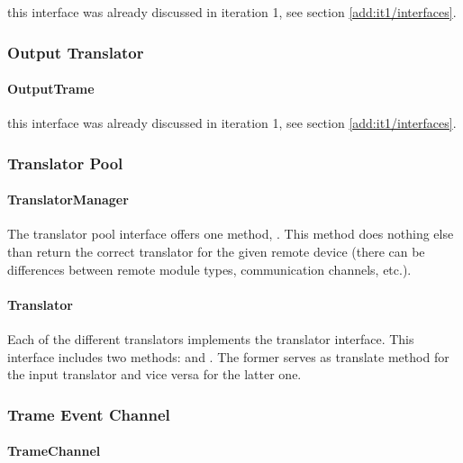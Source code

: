 \npar this interface was already discussed in iteration 1, see section
\ref{add:it1/interfaces}.

\subsubsection{Output Translator}

\paragraph{OutputTrame}

\npar this interface was already discussed in iteration 1, see section
\ref{add:it1/interfaces}.

\subsubsection{Translator Pool}

\paragraph{TranslatorManager}

\npar The translator pool interface offers one method,
. This method does nothing
else than return the correct translator for the given remote device (there can be
differences between remote module types, communication channels, etc.).

\paragraph{Translator}

\npar Each of the different translators implements the 
translator interface. This interface includes two methods:
 and
. The former serves as translate
method for the input translator and vice versa for the latter one.

\subsubsection{Trame Event Channel}

\paragraph{TrameChannel} %

